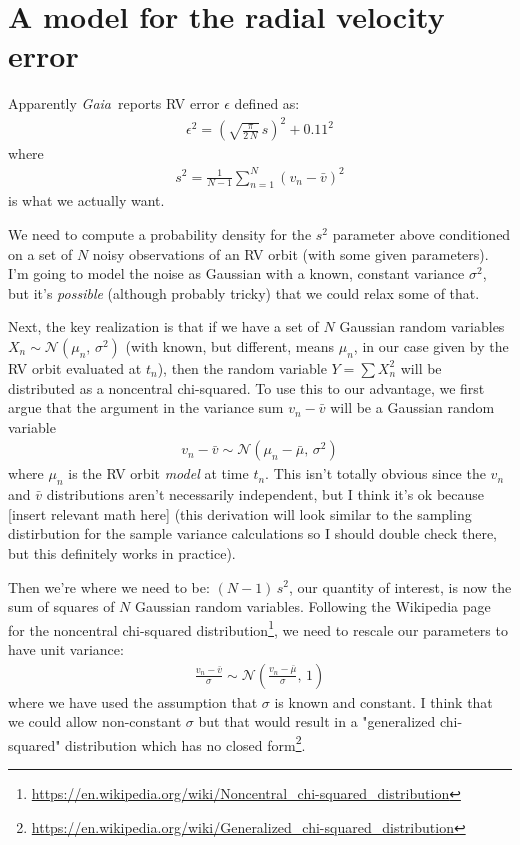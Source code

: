 \documentclass[modern, letterpaper]{aastex631}
\newcommand{\project}[1]{\textsl{#1}}
\newcommand{\Gaia}{\project{Gaia}}
\begin{document}
\section{A model for the radial velocity error}

Apparently \Gaia\ reports RV error $\epsilon$ defined as:
\begin{eqnarray}
	\epsilon^2 = \left(\sqrt{\frac{\pi}{2\,N}}\,s\right)^2 + 0.11^2
\end{eqnarray}
where
\begin{eqnarray}
	s^2 = \frac{1}{N-1}\sum_{n=1}^N \left(v_n - \bar{v}\right)^2
\end{eqnarray}
is what we actually want.

We need to compute a probability density for the $s^2$ parameter above conditioned on a set of $N$ noisy observations of an RV orbit (with some given parameters).
I'm going to model the noise as Gaussian with a known, constant variance $\sigma^2$, but it's \emph{possible} (although probably tricky) that we could relax some of that.

Next, the key realization is that if we have a set of $N$ Gaussian random variables $X_n \sim \mathcal{N}\left(\mu_n,\,\sigma^2\right)$ (with known, but different, means $\mu_n$, in our case given by the RV orbit evaluated at $t_n$), then the random variable $Y = \sum X_n^2$ will be distributed as a noncentral chi-squared.
To use this to our advantage, we first argue that the argument in the variance sum $v_n - \bar{v}$ will be a Gaussian random variable
\begin{eqnarray}
	v_n - \bar{v} \sim \mathcal{N}\left(\mu_n - \bar{\mu},\,\sigma^2\right)
\end{eqnarray}
where $\mu_n$ is the RV orbit \emph{model} at time $t_n$.
This isn't totally obvious since the $v_n$ and $\bar{v}$ distributions aren't necessarily independent, but I think it's ok because [insert relevant math here] (this derivation will look similar to the sampling distirbution for the sample variance calculations so I should double check there, but this definitely works in practice).

Then we're where we need to be: $(N - 1)\,s^2$, our quantity of interest, is now the sum of squares of $N$ Gaussian random variables.
Following the Wikipedia page for the noncentral chi-squared distribution\footnote{\url{https://en.wikipedia.org/wiki/Noncentral_chi-squared_distribution}}, we need to rescale our parameters to have unit variance:
\begin{eqnarray}
	\frac{v_n - \bar{v}}{\sigma} \sim \mathcal{N}\left(\frac{v_n - \bar{\mu}}{\sigma},\,1\right)
\end{eqnarray}
where we have used the assumption that $\sigma$ is known and constant.
I think that we could allow non-constant $\sigma$ but that would result in a "generalized chi-squared" distribution which has no closed form\footnote{\url{https://en.wikipedia.org/wiki/Generalized_chi-squared_distribution}}.
\end{document}
